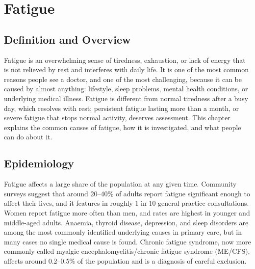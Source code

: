 \chapter{Fatigue}

\section*{Definition and Overview}
Fatigue is an overwhelming sense of tiredness, exhaustion, or lack of energy that is not relieved by rest and interferes with daily life. It is one of the most common reasons people see a doctor, and one of the most challenging, because it can be caused by almost anything: lifestyle, sleep problems, mental health conditions, or underlying medical illness. Fatigue is different from normal tiredness after a busy day, which resolves with rest; persistent fatigue lasting more than a month, or severe fatigue that stops normal activity, deserves assessment. This chapter explains the common causes of fatigue, how it is investigated, and what people can do about it.

\section*{Epidemiology}
Fatigue affects a large share of the population at any given time. Community surveys suggest that around 20--40\% of adults report fatigue significant enough to affect their lives, and it features in roughly 1 in 10 general practice consultations. Women report fatigue more often than men, and rates are highest in younger and middle-aged adults. Anaemia, thyroid disease, depression, and sleep disorders are among the most commonly identified underlying causes in primary care, but in many cases no single medical cause is found. Chronic fatigue syndrome, now more commonly called myalgic encephalomyelitis/chronic fatigue syndrome (ME/CFS), affects around 0.2--0.5\% of the population and is a diagnosis of careful exclusion.

